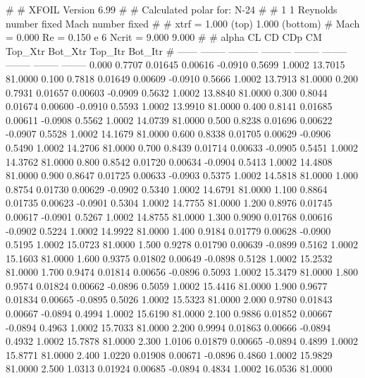 #  
#       XFOIL         Version 6.99
#  
# Calculated polar for: N-24                                            
#  
# 1 1 Reynolds number fixed          Mach number fixed         
#  
# xtrf =   1.000 (top)        1.000 (bottom)  
# Mach =   0.000     Re =     0.150 e 6     Ncrit =   9.000  9.000
#  
#   alpha    CL        CD       CDp       CM     Top_Xtr  Bot_Xtr  Top_Itr  Bot_Itr
#  ------ -------- --------- --------- -------- -------- -------- -------- --------
   0.000   0.7707   0.01645   0.00616  -0.0910   0.5699   1.0002  13.7015  81.0000
   0.100   0.7818   0.01649   0.00609  -0.0910   0.5666   1.0002  13.7913  81.0000
   0.200   0.7931   0.01657   0.00603  -0.0909   0.5632   1.0002  13.8840  81.0000
   0.300   0.8044   0.01674   0.00600  -0.0910   0.5593   1.0002  13.9910  81.0000
   0.400   0.8141   0.01685   0.00611  -0.0908   0.5562   1.0002  14.0739  81.0000
   0.500   0.8238   0.01696   0.00622  -0.0907   0.5528   1.0002  14.1679  81.0000
   0.600   0.8338   0.01705   0.00629  -0.0906   0.5490   1.0002  14.2706  81.0000
   0.700   0.8439   0.01714   0.00633  -0.0905   0.5451   1.0002  14.3762  81.0000
   0.800   0.8542   0.01720   0.00634  -0.0904   0.5413   1.0002  14.4808  81.0000
   0.900   0.8647   0.01725   0.00633  -0.0903   0.5375   1.0002  14.5818  81.0000
   1.000   0.8754   0.01730   0.00629  -0.0902   0.5340   1.0002  14.6791  81.0000
   1.100   0.8864   0.01735   0.00623  -0.0901   0.5304   1.0002  14.7755  81.0000
   1.200   0.8976   0.01745   0.00617  -0.0901   0.5267   1.0002  14.8755  81.0000
   1.300   0.9090   0.01768   0.00616  -0.0902   0.5224   1.0002  14.9922  81.0000
   1.400   0.9184   0.01779   0.00628  -0.0900   0.5195   1.0002  15.0723  81.0000
   1.500   0.9278   0.01790   0.00639  -0.0899   0.5162   1.0002  15.1603  81.0000
   1.600   0.9375   0.01802   0.00649  -0.0898   0.5128   1.0002  15.2532  81.0000
   1.700   0.9474   0.01814   0.00656  -0.0896   0.5093   1.0002  15.3479  81.0000
   1.800   0.9574   0.01824   0.00662  -0.0896   0.5059   1.0002  15.4416  81.0000
   1.900   0.9677   0.01834   0.00665  -0.0895   0.5026   1.0002  15.5323  81.0000
   2.000   0.9780   0.01843   0.00667  -0.0894   0.4994   1.0002  15.6190  81.0000
   2.100   0.9886   0.01852   0.00667  -0.0894   0.4963   1.0002  15.7033  81.0000
   2.200   0.9994   0.01863   0.00666  -0.0894   0.4932   1.0002  15.7878  81.0000
   2.300   1.0106   0.01879   0.00665  -0.0894   0.4899   1.0002  15.8771  81.0000
   2.400   1.0220   0.01908   0.00671  -0.0896   0.4860   1.0002  15.9829  81.0000
   2.500   1.0313   0.01924   0.00685  -0.0894   0.4834   1.0002  16.0536  81.0000
